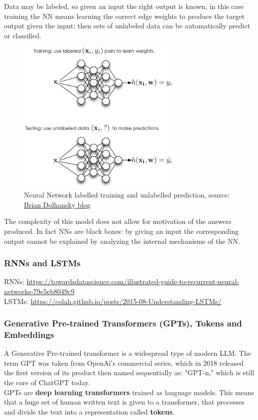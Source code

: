 \documentclass[12pt]{article}
\begin{document}
Data may be labeled, so given an input the right output is known, in this case training the NN means learning the correct edge weights to produce the target output given the input; then sets of unlabeled data can be automatically predict or classified.
    \begin{figure}[H]
    \centering
            \includegraphics[width=0.7\textwidth]{trainingNN.png}
    \caption{Neural Network labelled training and unlabelled prediction, source: \href{https://www.briandolhansky.com/blog/artificial-neural-networks-linear-regression-part-1}{Brian Dolhansky blog}}
    \end{figure}

The complexity of this model does not allow for motivation of the answers produced. In fact NNs are black boxes: by giving an input the corresponding output cannot be explained by analyzing the internal mechanisms of the NN.
		\subsubsection{RNNs and LSTMs}
		RNNs: \url{https://towardsdatascience.com/illustrated-guide-to-recurrent-neural-networks-79e5eb8049c9}\\
		LSTMs: \url{https://colah.github.io/posts/2015-08-Understanding-LSTMs/}

        \subsubsection{Generative Pre-trained Transformers (GPTs), Tokens and Embeddings}
A Generative Pre-trained transformer is a widespread type of modern LLM. The term GPT was taken from OpenAi's commercial series, which in 2018 released the first version of its product then named sequentially as: "GPT-n," which is still the core of ChatGPT today.\\
GPTs are \textbf{deep learning transformers} trained as language models. This means that a huge set of human written text is given to a transformer, that processes and divide the text into a representation called \textbf{tokens}.\\
\end{document}
